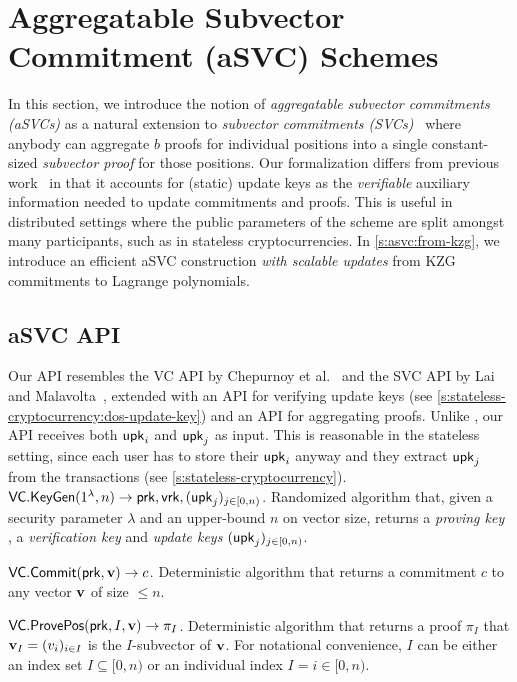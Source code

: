 \section{Aggregatable Subvector Commitment (aSVC) Schemes}
\label{s:svc}

In this section, we introduce the notion of \textit{aggregatable subvector commitments (aSVCs)} as a natural extension to \textit{subvector commitments (SVCs)}~\cite{LM19} where anybody can aggregate $b$ proofs for individual positions into a single constant-sized \textit{subvector proof} for those positions.
Our formalization differs from previous work~\cite{BBF19,GRWZ20} in that it accounts for (static) update keys as the \textit{verifiable} auxiliary information needed to update commitments and proofs.
This is useful in distributed settings where the public parameters of the scheme are split amongst many participants, such as in stateless cryptocurrencies.
\ifNotCameraReady
In \cref{s:asvc:from-kzg}, we introduce an efficient aSVC construction \textit{with scalable updates} from KZG commitments to Lagrange polynomials.
\fi

\subsection{aSVC API}
\label{s:prelim:vcs:api}
\label{s:asvc:defs}

Our API resembles the VC API by Chepurnoy et al.~\cite{CPZ18} and the SVC API by Lai and Malavolta~\cite{LM19}, extended with an API for verifying update keys (see \cref{s:stateless-cryptocurrency:dos-update-key}) and an API for aggregating proofs.
Unlike \cite{CPZ18}, our \vcproofupdate API receives both $\mathsf{upk}_i$ and $\mathsf{upk}_j$ as input.
This is reasonable in the stateless setting, since each user has to store their $\mathsf{upk}_i$ anyway and they extract $\mathsf{upk}_j$ from the transactions (see \cref{s:stateless-cryptocurrency}).
\\

\api $\mathsf{VC}.\mathsf{KeyGen}(1^\lambda, n)\rightarrow \mathsf{prk},\mathsf{vrk},(\mathsf{upk}_j)_{j\in[0,n)}$.
Randomized algorithm that, given a security parameter $\lambda$ and an upper-bound $n$ on vector size, returns a \textit{proving key} \prk, a \textit{verification key} \vrk and \textit{update keys} $(\mathsf{upk}_j)_{j\in[0,n)}$.

\api $\mathsf{VC}.\mathsf{Commit}(\mathsf{prk}, \bm{\mathrm{v}}) \rightarrow c$.
Deterministic algorithm that returns a commitment $c$ to any vector $\bm{\mathrm{v}}$ of size $\le n$.

\api $\mathsf{VC}.\mathsf{ProvePos}(\mathsf{prk}, I, \bm{\mathrm{v}}) \rightarrow \pi_I$.
Deterministic algorithm that returns a proof $\pi_I$ that $\bm{\mathrm{v}}_I = (v_i)_{i\in I}$ is the $I$-subvector of $\bm{\mathrm{v}}$.
For notational convenience, $I$ can be either an index set $I\subseteq [0,n)$ or an individual index $I = i\in [0,n)$.


